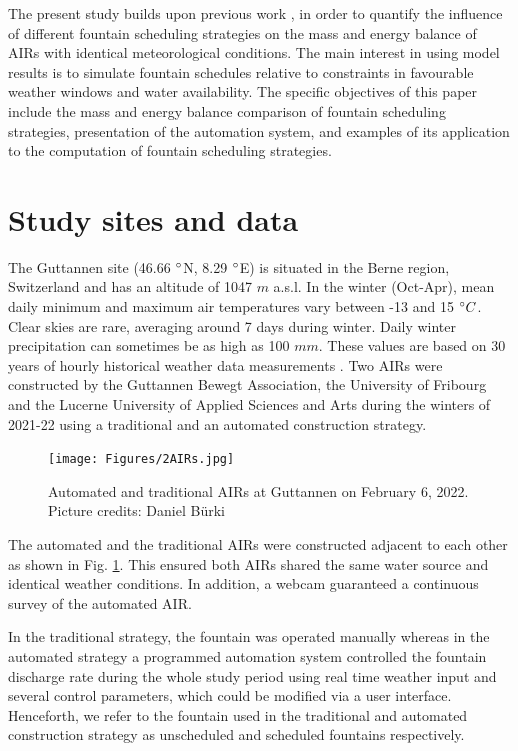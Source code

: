 \documentclass[tc, manuscript]{copernicus}
\begin{document}
The present study builds upon previous work \citep{balasubramanianInfluenceMeteorologicalConditions2022,
oerlemansBriefCommunicationGrowth2021}, in order to quantify the influence of different fountain scheduling
strategies on the mass and energy balance of AIRs with identical meteorological conditions. The main interest in
using model results is to simulate fountain schedules relative to constraints in favourable weather windows and
water availability.  The specific objectives of this paper include the mass and energy balance comparison of
fountain scheduling strategies, presentation of the automation system, and examples of its application to the
computation of fountain scheduling strategies.

\section{Study sites and data}

The Guttannen site (46.66 $^{\circ}$N, 8.29 $^{\circ}$E) is situated in the Berne region, Switzerland and has an
altitude of 1047 $m$ a.s.l. In the winter (Oct-Apr), mean daily minimum and maximum air temperatures vary
between -13 and 15 $^{\circ} C$. Clear skies are rare, averaging around 7 days during winter. Daily winter
precipitation can sometimes be as high as 100 $mm$. These values are based on 30 years of hourly historical
weather data measurements \citep{meteoblueClimateGuttannen2021}. Two AIRs were constructed by the Guttannen
Bewegt Association, the University of Fribourg and the Lucerne University of Applied Sciences and Arts during
the winters of 2021-22 using a traditional and an automated construction strategy.

\begin{figure}[t]
\texttt{[image: Figures/2AIRs.jpg]}
\caption{Automated and traditional AIRs at Guttannen on February 6, 2022. Picture credits: Daniel Bürki}
\label{fig:2AIR} 
\end{figure}

The automated and the traditional AIRs were constructed adjacent to each other as shown in Fig. \ref{fig:2AIR}.
This ensured both AIRs shared the same water source and identical weather conditions. In addition, a webcam
guaranteed a continuous survey of the automated AIR.   

In the traditional strategy, the fountain was operated manually whereas in the automated strategy a programmed
automation system controlled the fountain discharge rate during the whole study period using real time weather
input and several control parameters, which could be modified via a user interface. Henceforth, we refer to the
fountain used in the traditional and automated construction strategy as unscheduled and scheduled fountains
respectively.
\end{document}
